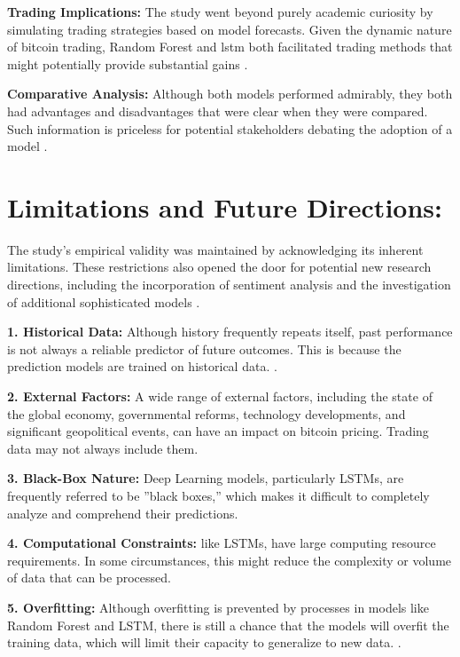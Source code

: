 \textbf{Trading Implications:} The study went beyond purely academic curiosity by simulating trading strategies based on model forecasts. Given the dynamic nature of bitcoin trading, Random Forest and \gls{lstm} both facilitated trading methods that might potentially provide substantial gains \citep{kristoufek2015main}.

\textbf{Comparative Analysis:} Although both models performed admirably, they both had advantages and disadvantages that were clear when they were compared. Such information is priceless for potential stakeholders debating the adoption of a model \citep{bao2017deep}.

\section{Limitations and Future Directions:}

The study's empirical validity was maintained by acknowledging its inherent limitations. These restrictions also opened the door for potential new research directions, including the incorporation of sentiment analysis and the investigation of additional sophisticated models \citep{bouri_hedge_2017}.

\textbf{1. Historical Data:} Although history frequently repeats itself, past performance is not always a reliable predictor of future outcomes. This is because the prediction models are trained on historical data. \citep{DBLP:books/lib/HastieTF09}.

\textbf{2. External Factors:} A wide range of external factors, including the state of the global economy, governmental reforms, technology developments, and significant geopolitical events, can have an impact on bitcoin pricing. Trading data may not always include them.

\textbf{3. Black-Box Nature:} Deep Learning models, particularly LSTMs, are frequently referred to be ”black boxes,” which makes it difficult to completely analyze and comprehend their predictions.

\textbf{4. Computational Constraints:} like LSTMs, have large computing resource requirements. In some circumstances, this might reduce the complexity or volume of data that can be processed.

\textbf{5. Overfitting:} Although overfitting is prevented by processes in models like Random Forest and LSTM, there is still a chance that the models will overfit the training data, which will limit their capacity to generalize to new data. \citep{DBLP:books/lib/HastieTF09}.

